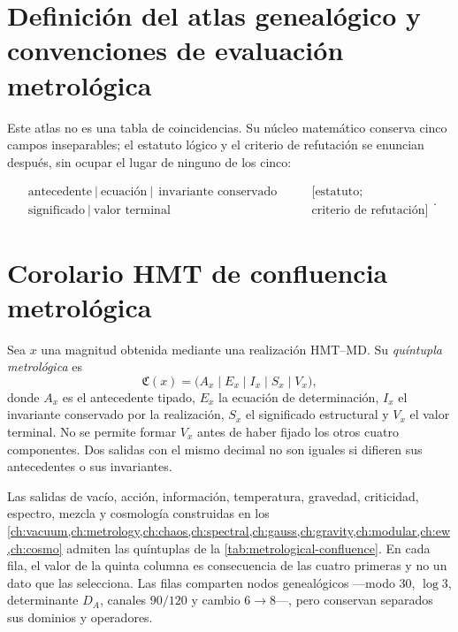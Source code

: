 \section{Definición del atlas genealógico y convenciones de evaluación metrológica}

Este atlas no es una tabla de coincidencias. Su n\'ucleo matem\'atico conserva
cinco campos inseparables; el estatuto l\'ogico y el criterio de refutaci\'on se enuncian despu\'es, sin ocupar el lugar de ninguno de los cinco:

\begin{equation}
\boxed{
\begin{gathered}
\text{antecedente}\ \big|\ \text{ecuaci\'on}\ \big|\
\ \text{invariante conservado}\\
\text{significado}\ \big|\ \text{valor terminal}
\end{gathered}}
\qquad
\begin{gathered}
[\text{estatuto};\\ \text{criterio de refutación}]
\end{gathered}.
\label{eq:atlas-six-fields}
\end{equation}


\section{Corolario HMT de confluencia metrol\'ogica}
\label{sec:metrological-confluence}

\begin{definition}
Sea \(x\) una magnitud obtenida mediante una realizaci\'on HMT--MD. Su
\emph{qu\'intupla
metrol\'ogica} es
\[
 \mathfrak C(x)=
 \bigl(A_x\mid E_x\mid I_x\mid S_x\mid V_x\bigr),
\]
donde \(A_x\) es el antecedente tipado, \(E_x\) la ecuaci\'on de
determinaci\'on, \(I_x\) el invariante conservado por la realizaci\'on,
\(S_x\) el significado
estructural y \(V_x\) el valor terminal. No se permite formar \(V_x\) antes de
haber fijado los otros cuatro componentes. Dos salidas con el mismo decimal
no son iguales si difieren sus antecedentes o sus invariantes.
\end{definition}

\begin{corollary}
\label{cor:metrological-confluence}
Las salidas de vac\'io, acci\'on, informaci\'on, temperatura, gravedad,
criticidad, espectro, mezcla y cosmolog\'ia construidas en los
\cref{ch:vacuum,ch:metrology,ch:chaos,ch:spectral,ch:gauss,ch:gravity,ch:modular,ch:ew,ch:cosmo}
admiten las qu\'intuplas de la \cref{tab:metrological-confluence}. En cada
fila, el valor de la quinta columna es consecuencia de las cuatro primeras y
no un dato que las selecciona. Las filas comparten nodos geneal\'ogicos
---modo \(30\), \(\log3\), determinante \(D_A\), canales \(90/120\) y cambio
\(6\to8\)---, pero conservan separados sus dominios y operadores.
\end{corollary}


